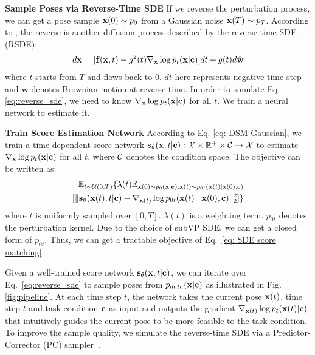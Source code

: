 \documentclass[10pt,twocolumn,letterpaper]{article}
\begin{document}
\noindent
\textbf{Sample Poses via Reverse-Time SDE}
If we reverse the perturbation process, we can get a pose sample $\mathbf{x}(0) \sim p_0$ from a Gaussian noise $\mathbf{x}(T) \sim p_T$. According to \cite{anderson1982reverse,song2020score}, the reverse is another diffusion process described by the reverse-time SDE (RSDE):
\begin{equation}
\begin{aligned}
    d\mathbf{x} = [\mathbf{f}(\mathbf{x}, t) - g^2(t)\nabla_{\mathbf{x}}\log p_{t}(\mathbf{x} | \mathbf{c} )] dt + g(t) d\bar{\mathbf{w}}
\label{eq:reverse_sde}
\end{aligned}
\end{equation}
where $t$ starts from $T$ and flows back to $0$. $dt$ here represents negative time step and $\bar{\mathbf{w}}$ denotes Brownian motion at reverse time. In order to simulate Eq. \ref{eq:reverse_sde}, we need to know $\nabla_{\mathbf{x}}\log p_{t}(\mathbf{x} | \mathbf{c} )$ for all $t$. We train a neural network to estimate it.


\noindent
\textbf{Train Score Estimation Network}
According to Eq. \ref{eq: DSM-Gaussian}, we train a time-dependent score network $\mathbf{s}_{\theta}(\mathbf{x}, t | \mathbf{c}): \mathcal{X} \times \mathbb{R}^+ \times \mathcal{C} \rightarrow \mathcal{X} $ to estimate $\nabla_{\mathbf{x}}\log p_{t}(\mathbf{x} | \mathbf{c} )$ for all $t$, where $\mathcal{C}$ denotes the condition space. The objective can be written as:
\begin{equation}
\begin{aligned}
   \E_{t\sim \mathcal{U}(0, T)}
   \{
   \lambda(t)\E_{\pose(0) \sim p_0(\pose|\cond), \pose(t) \sim p_{0t}(\pose(t) | \pose(0) , \cond)}
   \\ 
   [\|\score(\pose(t), t | \cond)  - \nabla_{\pose(t)}\log p_{0t}(\pose(t) \mid \pose(0) , \cond)\|_2^2 ] \}
\end{aligned}
\label{eq: SDE score matching}
\end{equation}
where $t$ is uniformly sampled over $[0, T]$. $\lambda(t)$ is a weighting term. $p_{0t}$ denotes the perturbation kernel. Due to the choice of subVP SDE, we can get a closed form of $p_{0t}$. Thus, we can get a tractable objective of Eq.~\ref{eq: SDE score matching}. 







Given a well-trained score network $\mathbf{s}_{\theta}(\mathbf{x}, t | \mathbf{c})$, we can iterate over Eq.~\ref{eq:reverse_sde} to sample poses from $p_{data}(\mathbf{x}|\mathbf{c})$ as illustrated in Fig. \ref{fig:pipeline}. At each time step $t$, the network takes the current pose $\mathbf{x}(t)$, time step $t$ and task condition $\mathbf{c}$ as input and outputs the gradient $\nabla_{\mathbf{x}(t)}\log p_{t}(\mathbf{x}(t) | \mathbf{c} )$ that intuitively guides the current pose to be more feasible to the task condition. To improve the sample quality, we simulate the reverse-time SDE via a Predictor-Corrector (PC) sampler~\cite{song2020score}. 
\end{document}
